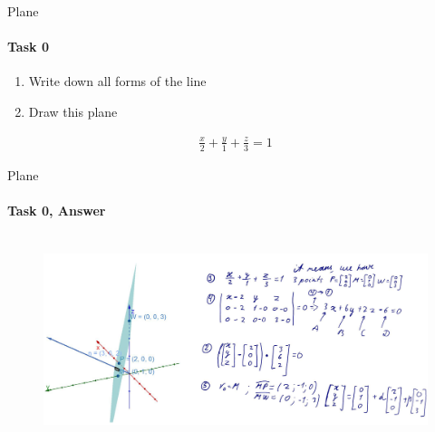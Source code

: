 \documentclass[aspectratio=169]{beamer}
\begin{document}
\begin{frame}[t]{Plane}
    \framesubtitle{Task 0}
    \begin{minipage}{0.49\textwidth}
        \begin{enumerate}
            \item Write down all forms of the line
            \item Draw this plane
        \end{enumerate}

    \end{minipage}
    \begin{minipage}{0.5\textwidth}
        \begin{align*}
            \frac{x}{2}+\frac{y}{1}+\frac{z}{3}=1
        \end{align*}
    \end{minipage}
\end{frame}

\begin{frame}[t]{Plane}
    \framesubtitle{Task 0, Answer}
    \vspace{-0.6cm}
    \begin{figure}[H]
        \href{https://www.geogebra.org/m/rxduxkwn}{
            \centering\includegraphics[height=6cm,width=1\textwidth,keepaspectratio]{plane_ans.png}}
        \label{fig:plane_ans.png}
    \end{figure}
\end{frame}
\end{document}
